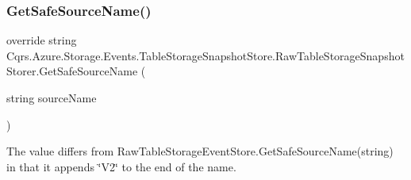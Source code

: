 \subsubsection{\texorpdfstring{Get\+Safe\+Source\+Name()}{GetSafeSourceName()}}
{\footnotesize\ttfamily override string Cqrs.\+Azure.\+Storage.\+Events.\+Table\+Storage\+Snapshot\+Store.\+Raw\+Table\+Storage\+Snapshot\+Storer.\+Get\+Safe\+Source\+Name (\begin{DoxyParamCaption}\item[{string}]{source\+Name }\end{DoxyParamCaption})\hspace{0.3cm}{\ttfamily [protected]}}



The value differs from Raw\+Table\+Storage\+Event\+Store.\+Get\+Safe\+Source\+Name(string) in that it appends \char`\"{}\+V2\char`\"{} to the end of the name. 


